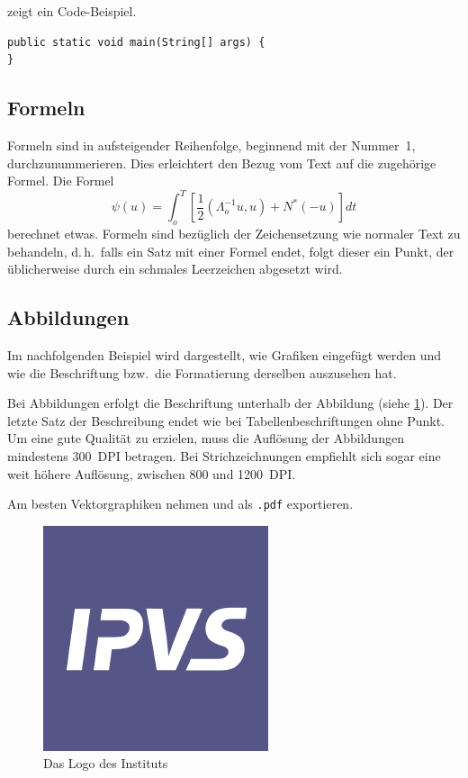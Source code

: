 \documentclass[runningheads,a4paper]{llncs}[2015/06/24]
\begin{document}
 zeigt ein Code-Beispiel.

\begin{lstlisting}[float,caption=A floating example,label=lst:example]
public static void main(String[] args) {
}
\end{lstlisting}

\subsection{Formeln}
Formeln sind in aufsteigender Reihenfolge, beginnend mit der Nummer~1, durchzunummerieren.
Dies erleichtert den Bezug vom Text auf die zugehörige Formel.
Die Formel
%
\begin{equation}
  \psi (u) = \int_{o}^{T} \left[\frac{1}{2}
  \left(\Lambda_{o}^{-1} u,u\right) + N^{\ast} (-u)\right] dt
\end{equation}
%
berechnet etwas.
Formeln sind bezüglich der Zeichensetzung wie normaler Text zu behandeln, d.\,h.\ falls ein Satz mit einer Formel endet, folgt dieser ein Punkt, der üblicherweise durch ein schmales Leerzeichen abgesetzt wird.

\subsection{Abbildungen}
Im nachfolgenden Beispiel wird dargestellt, wie Grafiken eingefügt werden und wie die Beschriftung bzw.\ die Formatierung derselben auszusehen hat.

Bei Abbildungen erfolgt die Beschriftung unterhalb der Abbildung (siehe \cref{fig:logo}).
Der letzte Satz der Beschreibung endet wie bei Tabellenbeschriftungen ohne Punkt.
Um eine gute Qualität zu erzielen, muss die Auflösung der Abbildungen mindestens 300~DPI betragen.
Bei Strichzeichnungen empfiehlt sich sogar eine weit höhere Auflösung, zwischen 800 und
1200~DPI.

Am besten Vektorgraphiken nehmen und als \texttt{.pdf} exportieren.

\begin{figure}
  \begin{center}
    \includegraphics[width=.5\textwidth]{ipvslogo.png}
    \caption{Das Logo des Instituts}
    \label{fig:logo}
   \end{center}
\end{figure}
\end{document}
